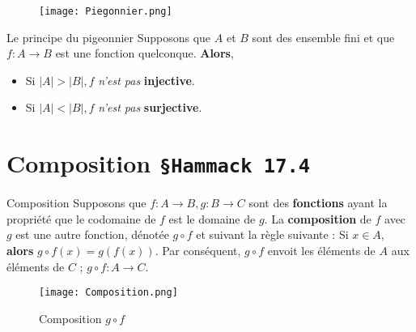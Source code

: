\documentclass[16pt]{report}
\begin{document}
\begin{multicols*}{2}
            \begin{figure}[H]
                \begin{center}
                    \texttt{[image: Piegonnier.png]}
                \end{center}
            \end{figure}


            \begin{Theorem}{Le principe du pigeonnier}{}
                Supposons que $A$ et $B$ sont des ensemble fini et que $f : A \rightarrow  B$ est 
                une fonction quelconque. \textbf{Alors}, 

                \begin{itemize}
                    \item Si $|A| > |B|, f$ \textit{n'est pas} \textbf{injective}. 
                    \item Si $|A| < |B|, f$ \textit{n'est pas} \textbf{surjective}.   
                \end{itemize}
            \end{Theorem}


            \section{Composition \texttt{\small{\S Hammack 17.4}}}


            \begin{Definitionx}{Composition}{}
                Supposons que $f : A \rightarrow B, g : B \rightarrow C$ sont des \textbf{fonctions} ayant la 
                propriété que le codomaine de $f$ est le domaine de $g$. La \textbf{composition} de 
                $f$ avec $g$ est une autre fonction, dénotée $ g \circ f$ et suivant la règle suivante : 
                Si $x \in A$, \textbf{alors} $g \circ f(x) =  g(f(x))$. Par conséquent, $g \circ f $ envoit 
                les éléments de $A$ aux éléments de $C$ ; $g \circ f: A \rightarrow  C$. 
            \end{Definitionx}

            

            \begin{figure}[H]
                \begin{center}
                    \texttt{[image: Composition.png]}
                \end{center}
                \caption{Composition $g\circ f$}
            \end{figure}


\end{multicols*}
\end{document}
